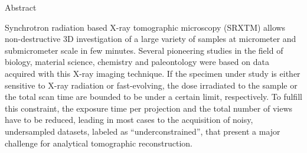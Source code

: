{
\begin{center}
	{\fontsize{20}{2}\selectfont \textcolor{darkcerulean}{Abstract}}
\end{center}
\color{black}
\addtocounter{page}{1}
\setcounter{page}{1}
Synchrotron radiation based X-ray tomographic microscopy (SRXTM) allows non-destructive 3D investigation
of a large variety of samples at micrometer and submicrometer scale in few minutes. Several pioneering studies in the field
of biology, material science, chemistry and paleontology were based on data acquired with this X-ray imaging technique.
\newline\newline
If the specimen under study is either sensitive to X-ray radiation or fast-evolving, the dose irradiated to the sample %
or the total scan time are 
bounded to be under a certain limit, respectively.
To fulfill this constraint, the exposure time per projection and the total number of views have to be reduced,
leading in most cases to the acquisition of noisy, undersampled datasets, labeled as ``underconstrained'', 
that present a major challenge for analytical tomographic reconstruction.
% 
% 
}
